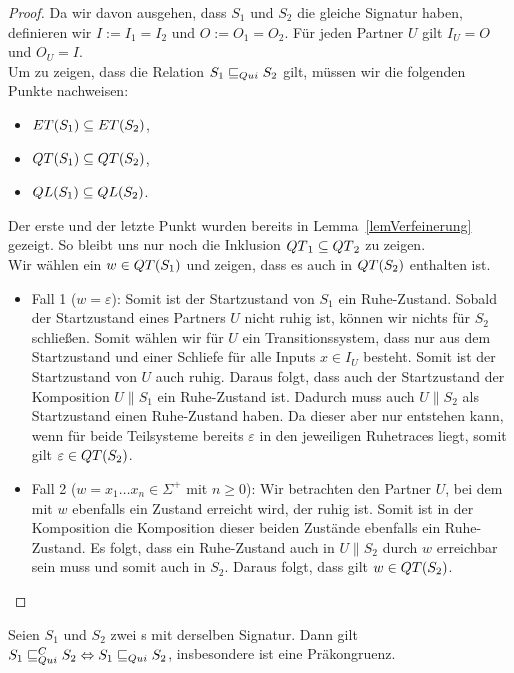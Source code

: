 \begin{proof}
  Da wir davon ausgehen, dass $S_1$ und $S_2$ die gleiche Signatur haben,
  definieren wir $I:=I_1=I_2$ und $O:=O_1=O_2$. Für jeden Partner $U$ gilt
  $I_U=O$ und $O_U=I$.\\
  Um zu zeigen, dass die Relation $S_1\sqsubseteq _{Qui} S_2$ gilt, müssen wir die
  folgenden Punkte nachweisen:
  \begin{itemize}
    \item $ET{}(S_1)\subseteq ET{}(S_2)$,
    \item $QT{}(S_1)\subseteq QT{}(S_2)$,
    \item $QL{}(S_1)\subseteq QL{}(S_2)$.
  \end{itemize}
  Der erste und der letzte Punkt wurden bereits in Lemma~\ref{lemVerfeinerung}
  gezeigt. So bleibt uns nur noch die Inklusion $QT{}_1\subseteq QT{}_2$ zu
  zeigen.\\
  Wir wählen ein $w\in QT{}(S_1)$ und zeigen, dass es auch in $QT{}(S_2)$
  enthalten ist.
  \begin{itemize}
    \item Fall 1 ($w=\varepsilon$): Somit ist der Startzustand von $S_1$ ein
      Ruhe-Zustand. Sobald der Startzustand eines Partners $U$ nicht
      ruhig ist, können wir nichts für $S_2$ schließen. Somit wählen wir
      für $U$ ein Transitionssystem, dass nur aus dem Startzustand und einer
      Schliefe für alle Inputs $x\in I_U$ besteht. Somit ist der Startzustand
      von $U$ auch ruhig. Daraus folgt, dass auch der Startzustand der
      Komposition $U\|S_1$ ein Ruhe-Zustand ist. Dadurch muss auch
      $U\|S_2$ als Startzustand einen Ruhe-Zustand haben. Da dieser aber
      nur entstehen kann, wenn für beide Teilsysteme bereits $\varepsilon$ in
      den jeweiligen Ruhetraces liegt, somit gilt $\varepsilon\in
      QT{}(S_2)$.
    \item Fall 2 ($w=x_1\dots x_n\in\Sigma ^+$ mit $n\geq 0$): Wir betrachten
      den Partner $U$, bei dem mit $w$ ebenfalls ein Zustand erreicht wird, der
      ruhig ist. Somit ist in der Komposition die Komposition dieser
      beiden Zustände ebenfalls ein Ruhe-Zustand. Es folgt, dass ein
      Ruhe-Zustand auch in $U\|S_2$ durch $w$ erreichbar sein muss und
      somit auch in $S_2$. Daraus folgt, dass gilt $w\in QT{}(S_2)$.
  \end{itemize}
\end{proof}

\begin{satz}
  \label{satzQuiFullAbst}
  Seien $S_1$ und $S_2$ zwei \EIO{}s mit derselben Signatur. Dann gilt
  $S_1\sqsubseteq _{Qui}^C S_2\Leftrightarrow S_1\sqsubseteq _{Qui} S_2$, insbesondere ist \QRel{} eine
  Präkongruenz.
\end{satz}

